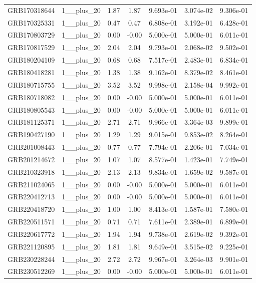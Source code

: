 \documentclass[12pt]{article}
\begin{document}
\begin{table}[h!]
{\begin{tabular}{l c c c c c c}
GRB170318644 & 1__plus_20 & 1.87 & 1.87 & 9.693e-01 & 3.074e-02 & 9.306e-01 \\
GRB170325331 & 1__plus_20 & 0.47 & 0.47 & 6.808e-01 & 3.192e-01 & 6.428e-01 \\
GRB170803729 & 1__plus_20 & 0.00 & -0.00 & 5.000e-01 & 5.000e-01 & 6.011e-01 \\
GRB170817529 & 1__plus_20 & 2.04 & 2.04 & 9.793e-01 & 2.068e-02 & 9.502e-01 \\
GRB180204109 & 1__plus_20 & 0.68 & 0.68 & 7.517e-01 & 2.483e-01 & 6.834e-01 \\
GRB180418281 & 1__plus_20 & 1.38 & 1.38 & 9.162e-01 & 8.379e-02 & 8.461e-01 \\
GRB180715755 & 1__plus_20 & 3.52 & 3.52 & 9.998e-01 & 2.158e-04 & 9.992e-01 \\
GRB180718082 & 1__plus_20 & 0.00 & -0.00 & 5.000e-01 & 5.000e-01 & 6.011e-01 \\
GRB180805543 & 1__plus_20 & 0.00 & -0.00 & 5.000e-01 & 5.000e-01 & 6.011e-01 \\
GRB181125371 & 1__plus_20 & 2.71 & 2.71 & 9.966e-01 & 3.364e-03 & 9.899e-01 \\
GRB190427190 & 1__plus_20 & 1.29 & 1.29 & 9.015e-01 & 9.853e-02 & 8.264e-01 \\
GRB201008443 & 1__plus_20 & 0.77 & 0.77 & 7.794e-01 & 2.206e-01 & 7.034e-01 \\
GRB201214672 & 1__plus_20 & 1.07 & 1.07 & 8.577e-01 & 1.423e-01 & 7.749e-01 \\
GRB210323918 & 1__plus_20 & 2.13 & 2.13 & 9.834e-01 & 1.659e-02 & 9.587e-01 \\
GRB211024065 & 1__plus_20 & 0.00 & -0.00 & 5.000e-01 & 5.000e-01 & 6.011e-01 \\
GRB220412713 & 1__plus_20 & 0.00 & -0.00 & 5.000e-01 & 5.000e-01 & 6.011e-01 \\
GRB220418720 & 1__plus_20 & 1.00 & 1.00 & 8.413e-01 & 1.587e-01 & 7.580e-01 \\
GRB220511571 & 1__plus_20 & 0.71 & 0.71 & 7.611e-01 & 2.389e-01 & 6.899e-01 \\
GRB220617772 & 1__plus_20 & 1.94 & 1.94 & 9.738e-01 & 2.619e-02 & 9.392e-01 \\
GRB221120895 & 1__plus_20 & 1.81 & 1.81 & 9.649e-01 & 3.515e-02 & 9.225e-01 \\
GRB230228244 & 1__plus_20 & 2.72 & 2.72 & 9.967e-01 & 3.264e-03 & 9.901e-01 \\
GRB230512269 & 1__plus_20 & 0.00 & -0.00 & 5.000e-01 & 5.000e-01 & 6.011e-01 \\

\end{tabular}}
\end{table}
\end{document}
